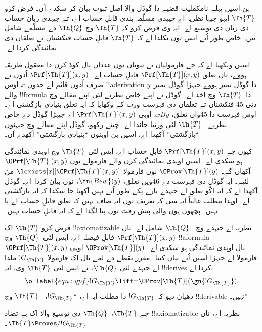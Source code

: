 \documentclass[../../../include/open-logic-section]{subfiles}
\begin{document}


ہن اسیں پہلے نامکملیت قضیے دا گوڈل والا اصل ثبوت بیان
کر سکدے آں۔ فرض کرو $\Th{T}$ ایہو جیہا نظریہ اے جیہدی
مسلّمہ بندی قابلِ حساب اے، تے جیہدی زبان حساب دی زبان دی
توسیع اے۔ ایہ وی فرض کرو کہ $\Th{T}$ وچ $\Th{Q}$ دے
مسلّمے شامل نیں۔ خاص طور اُتے ایس توں نکلدا اے کہ
$\Th{T}$ قابلِ حساب فنکشناں تے تعلقاں دی نمائندگی کردا اے۔

اسیں ویکھیا اے کہ جے فارمولیاں تے ثبوتاں نوں عدداں نال
کوڈ کرن دا معقول طریقہ ہووے، تاں تعلق $\Prf[\Th{T}](x,y)$
قابلِ حساب اے۔ $\Prf[\Th{T}](x,y)$ اُدوں تے صرف اُدوں
قائم اے جدوں $x$ اوس !!a{derivation} دا گوڈل نمبر ہووے
جیہڑا گوڈل نمبر~$y$ والے !!{formula} دا~$\Th{T}$ وچ
اخذ اے۔ گوڈل نے اپنے خاص نظریے لئی اپنے مقالے وچ دتی 45
فنکشناں تے تعلقاں دی فہرست ورت کے وکھایا کہ ایہ تعلق بنیادی
بازگشتی اے۔ اوس فہرست دا 45واں تعلق، $x B y$، اوہی
$\Prf[\Th{T}](x,y)$ اے جیہڑا گوڈل دے خاص نظریے
~$\Th{T}$ لئی ورتیا جاندا اے۔ چیتے رکھو،
گوڈل اپنے مقالے وچ جیہنوں “بازگشتی” آکھدا اے، اسیں ہن
اوہنوں “بنیادی بازگشتی” آکھدے آں۔

کیوں جے $\Prf[\Th{T}](x,y)$ قابلِ حساب اے، ایس لئی
$\Th{T}$ وچ اوہدی نمائندگی ہو سکدی اے۔ اسیں اوہدی
نمائندگی کرن والے فارمولے نوں $\OPrf[\Th{T}](x,y)$ آکھاں
گے۔ $\OProv[\Th{T}](y)$ نوں فارمولا
$\lexists[x][\OPrf[\Th{T}](x,y)]$ منّ لئیے۔ ایہ گوڈل دی
فہرست دے 46ویں تعلق، $\fn{Bew}(y)$، نوں بیان کردا اے۔
گوڈل آکھدا اے کہ ایہ اکّو تعلق اے جیہدے بارے پکے طور اُتے
نہیں آکھیا جا سکدا کہ ایہ بازگشتی اے۔ اوہدا مطلب غالباً ایہ سی
کہ تعریف توں ایہ صاف نہیں کہ تعلق قابلِ حساب اے یا نہیں۔
پچھوں ہون والی پیش رفت توں پتا لگدا اے کہ ایہ قابلِ حساب نہیں۔

فرض کرو $\Th{T}$ اک !!{axiomatizable} نظریہ اے جیہدے وچ
~$\Th{Q}$ شامل اے۔ تاں $\Prf[\Th{T}](x, y)$ قابلِ فیصلہ
اے، ایس لئی~$\Th{Q}$ وچ !!a{formula}~$\OPrf[\Th{T}](x, y)$
نال اوہدی نمائندگی ہو سکدی اے۔ $\OProv[\Th{T}](y)$ اوہی
فارمولا اے جیہڑا اسیں اُتے بیان کیتا۔ مقرر نقطے دے لمے نال
اک فارمولا $!G_\Th{T}$ ملدا اے جیہدے لئی $\Th{Q}$،
تے ایس لئی $\Th{T}$ وی، ایہ !!{derive}s کردا اے،
\begin{equation}
\ollabel{eqn:qpf}
!G_\Th{T} \liff \lnot \OProv[\Th{T}](\gn{!G_\Th{T}}).
\end{equation}
دھیان دیو کہ $!G_\Th{T}$ دا مطلب ایہ اے، “$!G_\Th{T}$،
~$\Th{T}$ وچ !!{derivable} نہیں۔”

\begin{lem}
جے $\Th{T}$،~$\Th{Q}$ دی توسیع والا اک بے تضاد
!!{axiomatizable} نظریہ اے، تاں $\Th{T} \Proves/ !G_\Th{T}$۔
\end{lem}
\end{document}
